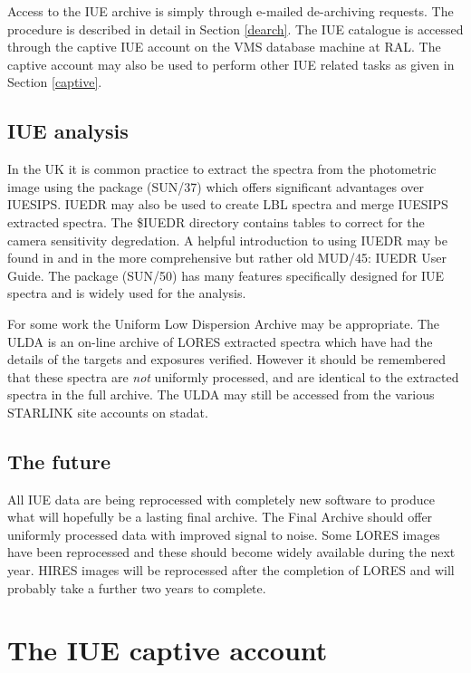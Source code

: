 \documentclass[11pt,twoside,nolof,noabs]{starlink}
\begin{document}
Access to the IUE archive is simply through e-mailed de-archiving requests.
The procedure is described in detail in Section \ref{dearch}.
The IUE catalogue is accessed through the captive IUE account on the VMS
database machine at RAL.
The captive account may also be used to perform other
IUE related tasks as given in Section \ref{captive}.

\subsection {IUE analysis}

In the UK it is common practice to extract the spectra from the photometric
image using the  package (SUN/37)
which offers significant advantages over IUESIPS.
IUEDR may also be used to create LBL spectra and merge IUESIPS extracted
spectra.
The \$IUEDR directory contains tables to correct for the camera sensitivity
degredation.
A helpful introduction to using IUEDR may be found in
 and in the more comprehensive but rather old MUD/45: IUEDR User
Guide.
The  package (SUN/50) has many features specifically designed for IUE
spectra and is widely used for the analysis.

For some work the Uniform Low Dispersion Archive  may be appropriate.
The ULDA is an on-line archive of LORES extracted spectra which have had the
details of the targets and exposures verified.
However it should be remembered that
these spectra are \textit{not} uniformly processed, and are identical to the
extracted spectra in the full archive.
The ULDA may still be accessed from the various STARLINK site accounts on
stadat.

\subsection {The future}

All IUE data are being reprocessed with completely new software to produce what
will hopefully be a lasting final archive.
The Final Archive should offer uniformly processed data with improved signal to
noise.
Some LORES images have been reprocessed and these should become widely
available during the next year.
HIRES images will be reprocessed after the completion of LORES and will
probably take a further two years to complete.

\section {The IUE captive account
\label{captive}}
\end{document}
